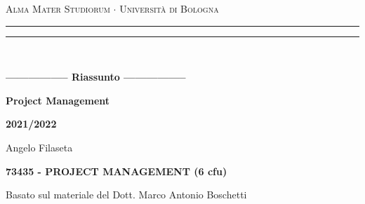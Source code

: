 \begin{titlepage}
    \begin{center}
        {{\Large{\textsc{Alma Mater Studiorum $\cdot$ Università di Bologna}}}}
        \rule[0.1cm]{15.8cm}{0.1mm}
        \rule[0.5cm]{15.8cm}{0.6mm}
        \\
        \vspace{3mm}
    \end{center}
    \vspace{2mm}
    \begin{center}
        {\LARGE{\bf{----------------- Riassunto -----------------}}}
        \vspace{5mm} \par \noindent
        {\Huge{\bf{Project Management}}}
        \vspace{10mm} \par \noindent
        {\LARGE \bf{2021/2022}}
        \vspace{15mm} \par \noindent
        {\Large Angelo Filaseta}
        \vspace{15mm} \par \noindent
        {\LARGE \bf{73435 - PROJECT MANAGEMENT (6 cfu)}}
        \vspace{8mm} \par \noindent
        {\Large Basato sul materiale del Dott. Marco Antonio Boschetti ~\cite{MarcoAnt98:online}}
	\end{center}
    \hfill
    \vspace{40mm}
\end{titlepage}
